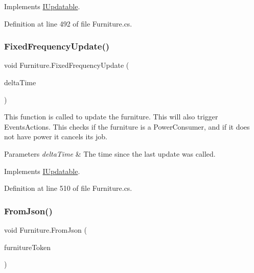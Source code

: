 Implements \hyperlink{interface_i_updatable_a07ea8d8e0858fd96c18baef481632c9d}{I\+Updatable}.



Definition at line 492 of file Furniture.\+cs.

\mbox{\label{class_furniture_af86f663d0e91858a85de20149a0188e5}} 
\subsubsection{\texorpdfstring{Fixed\+Frequency\+Update()}{FixedFrequencyUpdate()}}
{\footnotesize\ttfamily void Furniture.\+Fixed\+Frequency\+Update (\begin{DoxyParamCaption}\item[{float}]{delta\+Time }\end{DoxyParamCaption})}



This function is called to update the furniture. This will also trigger Events\+Actions. This checks if the furniture is a Power\+Consumer, and if it does not have power it cancels its job. 


\begin{DoxyParams}{Parameters}
{\em delta\+Time} & The time since the last update was called.\\
\hline
\end{DoxyParams}


Implements \hyperlink{interface_i_updatable_a360da1e579ac8d1ed8adb700176cc45f}{I\+Updatable}.



Definition at line 510 of file Furniture.\+cs.

\mbox{\label{class_furniture_aeedc1bfd6d4fedeb81b839f89a545583}} 
\subsubsection{\texorpdfstring{From\+Json()}{FromJson()}}
{\footnotesize\ttfamily void Furniture.\+From\+Json (\begin{DoxyParamCaption}\item[{J\+Token}]{furniture\+Token }\end{DoxyParamCaption})}



